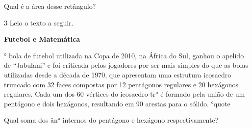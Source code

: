 \begin{escolha}
\begin{boxmedio}
\begin{boxmedio}
{\begin{boxpeq}
\begin{boxpeq}
{\begin{boxpeq}
\begin{boxmedio}
\begin{boxmedio}
\begin{boxpeq}
\begin{boxmedio}
\begin{boxpeq}
\begin{boxpeq}
\begin{boxpeq}
\begin{boxpeq}
\begin{boxmedio}
{\begin{boxmedio}
\begin{boxmedio}
\begin{boxpeq}
\begin{boxmedio}
\begin{boxpeq}
\begin{boxpeq}
\begin{boxpeq}
\begin{escolha}
{\begin{boxmedio}
\begin{boxpeq}
\begin{boxpeq}
\begin{boxpeq}
\begin{boxpeq}
\begin{boxpeq}
\begin{boxmedio}
\begin{boxpeq}
\begin{boxpeq}
\begin{boxpeq}
{\begin{boxpeq}
\begin{boxmedio}
\begin{boxpeq}
\begin{boxpeq}
\begin{boxpeq}
{\begin{boxpeq}
\begin{boxmedio}
{\begin{boxpeq}
\begin{boxpeq}
\begin{boxmedio}
\begin{boxmedio}
\begin{boxpeq}
\begin{boxpeq}
{\begin{boxpeq}
\begin{boxpeq}
\begin{boxpeq}
\begin{boxpeq}
\begin{boxpeq}
\begin{escolha}
\begin{escolha}
{\begin{boxmedio}
Qual é a área desse retângulo?

\begin{boxpeq}


\num{3} Leio o texto a seguir.

\begin{q°}
\textbf{Futebol e Matemática}

° bola de futebol utilizada na Copa de 2010, na África do Sul, ganhou o
apelido de ``Jabulani'' e foi criticada pelos jogadores por ser mais
simples do que as bolas utilizadas desde a década de 1970, que
apresentam uma estrutura icosaedro truncado com 32 faces compostas por
12 pentágonos regulares e 20 hexágonos regulares. Cada um dos 60
vértices do icosaedro tr° é formado pela união de um pentágono e
dois hexágonos, resultando em 90 arestas para o sólido.
\e°{quote}

Qual soma dos ân° internos do pentágono e hexágono respectivamente?

\begin{boxmedio}

\end{boxmedio}
\end{q°}
\end{boxpeq}
\end{boxmedio}}
\end{escolha}
\end{escolha}
\end{boxpeq}
\end{boxpeq}
\end{boxpeq}
\end{boxpeq}
\end{boxpeq}}
\end{boxpeq}
\end{boxpeq}
\end{boxmedio}
\end{boxmedio}
\end{boxpeq}
\end{boxpeq}}
\end{boxmedio}
\end{boxpeq}}
\end{boxpeq}
\end{boxpeq}
\end{boxpeq}
\end{boxmedio}
\end{boxpeq}}
\end{boxpeq}
\end{boxpeq}
\end{boxpeq}
\end{boxmedio}
\end{boxpeq}
\end{boxpeq}
\end{boxpeq}
\end{boxpeq}
\end{boxpeq}
\end{boxmedio}}
\end{escolha}
\end{boxpeq}
\end{boxpeq}
\end{boxpeq}
\end{boxmedio}
\end{boxpeq}
\end{boxmedio}
\end{boxmedio}}
\end{boxmedio}
\end{boxpeq}
\end{boxpeq}
\end{boxpeq}
\end{boxpeq}
\end{boxmedio}
\end{boxpeq}
\end{boxmedio}
\end{boxmedio}
\end{boxpeq}}
\end{boxpeq}
\end{boxpeq}}
\end{boxmedio}
\end{boxmedio}
\end{escolha}
